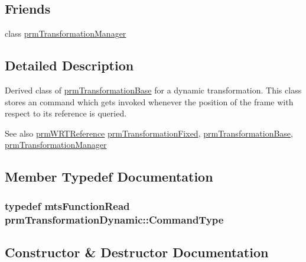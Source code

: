 \subsection*{Friends}
\begin{DoxyCompactItemize}
\item 
class \hyperlink{classprm_transformation_dynamic_af7fc0618e84bdf8b1d22bc2635f29eea}{prm\+Transformation\+Manager}
\end{DoxyCompactItemize}


\subsection{Detailed Description}
Derived class of \hyperlink{classprm_transformation_base}{prm\+Transformation\+Base} for a dynamic transformation. This class stores an command which gets invoked whenever the position of the frame with respect to its reference is queried.

\begin{DoxySeeAlso}{See also}
\hyperlink{prm_transformation_manager_8h_a10d83094c060676c6409e00c7f2f99d1}{prm\+W\+R\+T\+Reference} \hyperlink{classprm_transformation_fixed}{prm\+Transformation\+Fixed}, \hyperlink{classprm_transformation_base}{prm\+Transformation\+Base}, \hyperlink{classprm_transformation_manager}{prm\+Transformation\+Manager} 
\end{DoxySeeAlso}


\subsection{Member Typedef Documentation}
\hypertarget{classprm_transformation_dynamic_a08d4a3817f09c309060cbd5a70c6cfb9}{}
\subsubsection[{Command\+Type}]{\setlength{\rightskip}{0pt plus 5cm}typedef {\bf mts\+Function\+Read} {\bf prm\+Transformation\+Dynamic\+::\+Command\+Type}}\label{classprm_transformation_dynamic_a08d4a3817f09c309060cbd5a70c6cfb9}


\subsection{Constructor \& Destructor Documentation}
\hypertarget{classprm_transformation_dynamic_aefde621ffa116e694842a9eccfadc227}{}
